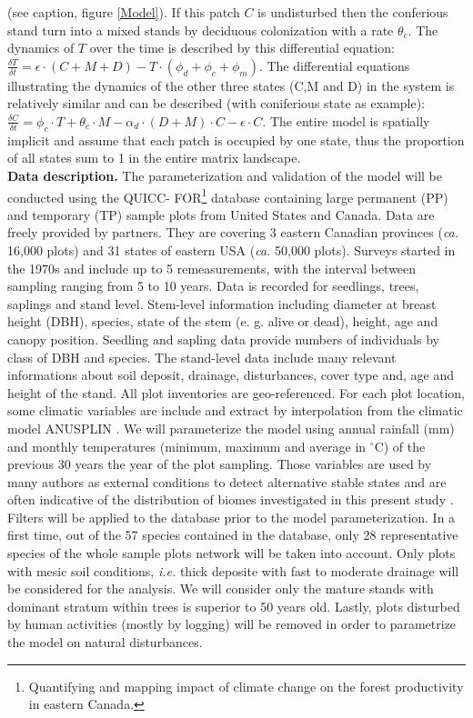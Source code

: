 (see caption, figure \ref{Model}). If this patch $C$ is undisturbed then the
conferious stand turn into a mixed stands by deciduous colonization with a
rate $\theta_c$. The dynamics of $T$ over the time is described by this
differential equation: $\frac{\delta T}{\delta t} = \epsilon \cdot (C+M+D) - T
\cdot (\phi_d + \phi_c + \phi_m)$. The differential equations illustrating the
dynamics of the other three states (C,M and D) in the system is relatively
similar and can be described (with coniferious state as example):
$\frac{\delta C}{\delta t} = \phi_c \cdot T + \theta_c \cdot M - \alpha_d
\cdot (D+M)\cdot C - \epsilon \cdot C$. The entire model is spatially implicit
and assume that each patch is occupied by one state, thus the proportion of
all states sum to 1 in the entire matrix landscape. \\

\textbf{Data description.} The parameterization and validation of the model
will be conducted using the QUICC- FOR\footnote{Quantifying and mapping impact
of climate change on the forest productivity in eastern Canada.} database
containing large permanent (PP) and temporary (TP) sample plots from United
States and Canada. Data are freely provided by partners. They are covering 3
eastern Canadian provinces (\textit{ca.} 16,000 plots) and 31 states of
eastern USA (\textit{ca.} 50,000 plots). Surveys started in the 1970s and
include up to 5 remeasurements, with the interval between sampling ranging
from 5 to 10 years. Data is recorded for seedlings, trees, saplings and stand
level. Stem-level information including diameter at breast height (DBH),
species, state of the stem (e. g. alive or dead), height, age and canopy
position. Seedling and sapling data provide numbers of individuals by class of
DBH and species. The stand-level data include many relevant informations about
soil deposit, drainage, disturbances, cover type and, age and height of the
stand. All plot inventories are geo-referenced. For each plot location, some
climatic variables are include and extract by interpolation from the climatic
model ANUSPLIN \cite{McKenney2011}. We will parameterize the model using
annual rainfall (mm) and monthly temperatures (minimum, maximum and average in
\ensuremath{^\circ}C) of the previous 30 years the year of the plot sampling.
Those variables are used by many authors as external conditions to detect
alternative stable states and are often indicative of the distribution of
biomes investigated in this present study
\cite{Goldblum2010,Hirota2011,Scheffer2012}. Filters will be applied to the
database prior to the model parameterization. In a first time, out of the 57
species contained in the  database, only 28 representative species of the
whole sample plots network will be taken into account. Only plots with mesic
soil conditions, \textit{i.e.} thick deposite with fast to moderate drainage
will be considered for the analysis. We will consider only the mature stands
with dominant stratum within trees is superior to 50 years old. Lastly, plots
disturbed by human activities (mostly by logging) will be removed in order to
parametrize the model on natural disturbances. \\

